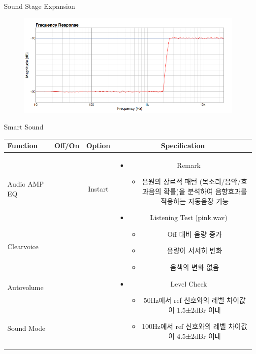 \documentclass{beamer}
\begin{document}
\begin{frame}[t]{Sound Stage Expansion}
\begin{figure}[b]
\includegraphics[height=0.32\textwidth]{figure/sxp.png}
\end{figure}

\end{frame}


\begin{frame}[t]{Smart Sound}
\begin{tiny}
\begin{tabular}{@{}lccc@{}}
\toprule
Function & Off/On & Option & Specification \\
\midrule
Audio AMP EQ & \color{black}{Off} & Instart &
\multirow{14}{60mm}{
\begin{itemize}
\item Remark
	\begin{itemize}
	\item 음원의 장르적 패턴 (목소리/음악/효과음의 확률)을 분석하여 음향효과를 적용하는 자동음장 기능
	\end{itemize}
\item Listening Test (pink.wav)
	\begin{itemize}
	\item Off 대비 음량 증가
	\item 음량이 서서히 변화
	\item 음색의 변화 없음
	\end{itemize}
\item Level Check
  \begin{itemize}
  \item 50Hz에서 ref 신호와의 레벨 차이값이 1.5±2dBr 이내
  \item 100Hz에서 ref 신호와의 레벨 차이값이 4.5±2dBr 이내
  \end{itemize}
\end{itemize}
} \\
Clearvoice & \color{black}{Off} & & \\
Autovolume & \color{black}{Off} & & \\
Sound Mode & \color{black}{Off} & & \\

\end{tabular}
\end{tiny}
\end{frame}
\end{document}
